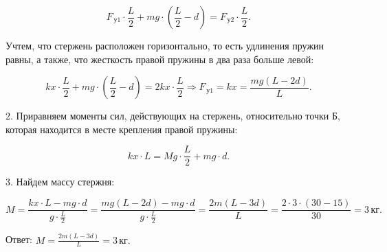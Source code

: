 \documentclass[12pt,a4paper]{article}
\begin{document}
{\[F_{\,\text{у}1} \cdot \frac{L}{2} + mg \cdot ( \frac{L}{2} - d ) =F_{\,\text{у}2} \cdot \frac{L}{2} .\]

Учтем, что стержень расположен горизонтально, то есть удлинения пружин равны, а также, что жесткость правой пружины в два раза больше левой:

\[kx \cdot \frac{L}{2} + mg \cdot ( \frac{L}{2} - d ) =2kx \cdot \frac{L}{2} \Rightarrow F_{\,\text{у}1}=kx= \frac{mg ( L - 2d )}{L} .\]

$2$.  Приравняем моменты сил, действующих на стержень, относительно точки Б, которая находится в месте крепления правой пружины:

\[kx \cdot L=Mg \cdot \frac{L}{2} + mg \cdot d.\]

$3$.  Найдем массу стержня:

\[M= \frac{kx \cdot L - mg \cdot d}{g \cdot \frac{L}{2}} = \frac{mg ( L - 2d ) - mg \cdot d}{g \cdot \frac{L}{2}} = \frac{2m ( L - 3d )}{L} = \frac{2 \cdot 3 \cdot ( 30 - 15 )}{30} =3\,\text{кг}.\]

Ответ: $M= \frac{2m ( L - 3d )}{L} =3\,\text{кг}.$
}
\end{document}
